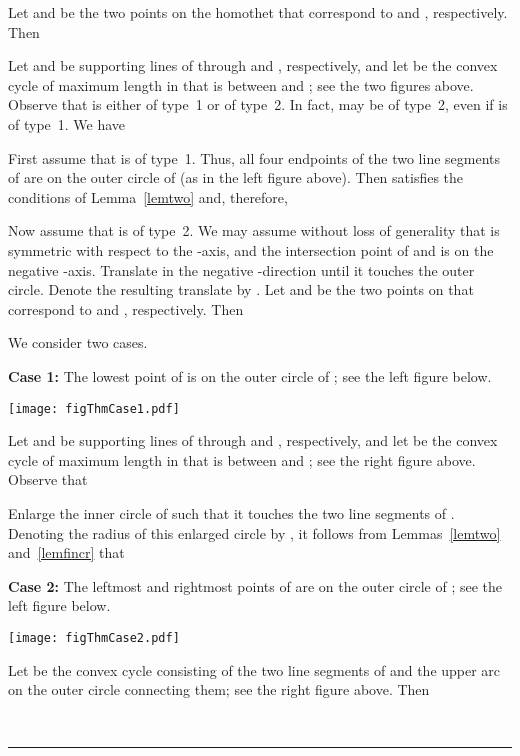 \documentclass[12pt]{article}
\newcommand{\qed}{\rule{0.5em}{1.5ex}}
\newcommand{\fqed}{{\hfill~\qed}}
\newenvironment{proof}{{\noindent \bf Proof.}}
                      {{\hfill \fqed} \vspace{1em}}
\begin{document}
\begin{proof}
Let  and  be the two points on the homothet  that correspond 
to  and , respectively. Then  
  
Let  and  be supporting lines of  through  
and , respectively, and let  be the convex cycle of maximum 
length in  that is between  and ; see the 
two figures above. Observe that  is either of type~1 or of type~2. 
In fact,  may be of type~2, even if  is of type~1. We have 
 
First assume that  is of type~1. Thus, all four endpoints of the 
two line segments of  are on the outer circle of  (as 
in the left figure above). Then  satisfies the conditions of 
Lemma~\ref{lemtwo} and, therefore, 
  

Now assume that  is of type~2. We may assume without loss of 
generality that  is symmetric with respect to the -axis, 
and the intersection point of  and  is on the 
negative -axis. Translate  in the negative -direction 
until it touches the outer circle. Denote the resulting translate 
by . Let  and  be the two points on  that correspond 
to  and , respectively. Then  
 
We consider two cases. 

\vspace{0.5em} 

\noindent 
{\bf Case 1:} The lowest point of  is on the outer circle of 
; see the left figure below. 

\begin{center}
   \texttt{[image: figThmCase1.pdf]}
\end{center}

Let  and  be supporting lines of  through  
and , respectively, and let  be the convex cycle of maximum 
length in  that is between  and ; see 
the right figure above. Observe that 
 
Enlarge the inner circle of  such that it touches the 
two line segments of . Denoting the radius of this enlarged 
circle by , it follows from Lemmas~\ref{lemtwo} and~\ref{lemfincr} 
that 
 

\vspace{0.5em} 

\noindent 
{\bf Case 2:} The leftmost and rightmost points of  are on the 
outer circle of ; see the left figure below. 

\begin{center}
   \texttt{[image: figThmCase2.pdf]}
\end{center}

Let  be the convex cycle consisting of the two line segments 
of  and the upper arc on the outer circle connecting them; see 
the right figure above. Then 
 

\end{proof}
\end{document}
